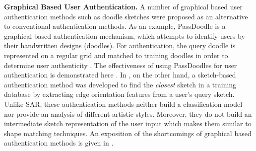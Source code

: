 \noindent\textbf{Graphical Based User Authentication.}
A number of graphical based user authentication methods such as doodle sketches were proposed as an alternative to conventional authentication methods. As an example, PassDoodle is a graphical based authentication mechanism, which attempts to identify users by their handwritten designs (doodles). For authentication, the query doodle is represented on a regular grid and matched to training doodles in order to determine user authenticity \cite{varenhorst2004passdoodles,Govindarajulu:2007:PMU:1322192.1322233}. The effectiveness of using PassDoodles for user authentication is demonstrated here . In , on the other hand, a sketch-based authentication method was developed to find the \emph{closest} sketch in a training database by extracting edge orientation features from a user's query sketch. Unlike SAR, these authentication methods neither build a classification model nor provide an analysis of different artistic styles. Moreover, they do not build an intermediate sketch representation of the user input which makes them similar to shape matching techniques. An exposition of the shortcomings of graphical based authentication methods is given in \cite{gani2010new}.





